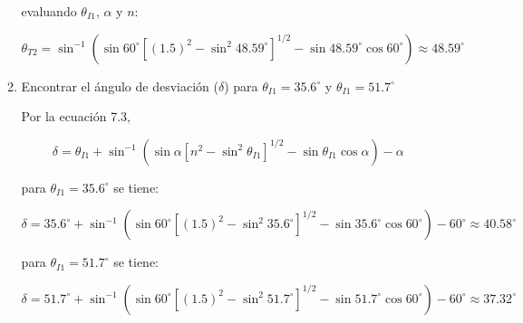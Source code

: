 \documentclass[12pt,a4paper]{article}
\begin{document}
\begin{enumerate}
\begin{enumerate}
    evaluando $\theta_{I1}$, $\alpha$ y $n$: 
    
    \begin{equation*}
        \theta_{T2} = \sin^{-1}{\left(\sin{60^{\circ}}[(1.5)^2-\sin^{2}{48.59^{\circ}}]^{1/2}-\sin{48.59^{\circ}}\cos{60^{\circ}}\right)} \approx 48.59^{\circ}
    \end{equation*}
    
    \item Encontrar el ángulo de desviación ($\delta$) para $\theta_{I1}=35.6^{\circ}$ y $\theta_{I1}=51.7^{\circ}$
    
    Por la ecuación 7.3,
    
    \begin{equation*}
        \delta = \theta_{I1}+ \sin^{-1}{\left(\sin{\alpha}[n^2-\sin^{2}{\theta_{I1}}]^{1/2}-\sin{\theta_{I1}\cos{\alpha}}\right)}-\alpha 
    \end{equation*}
    
    para $\theta_{I1}=35.6^{\circ}$ se tiene:
    
    \begin{equation*}
        \delta = 35.6^{\circ}+ \sin^{-1}{\left(\sin{60^{\circ}}[(1.5)^2-\sin^{2}{35.6^{\circ}}]^{1/2}-\sin{35.6^{\circ}}\cos{60^{\circ}}\right)}-60^{\circ} \approx 40.58^{\circ} 
    \end{equation*}
    
    para $\theta_{I1}=51.7^{\circ}$ se tiene:
    
    \begin{equation*}
        \delta = 51.7^{\circ}+ \sin^{-1}{\left(\sin{60^{\circ}}[(1.5)^2-\sin^{2}{51.7^{\circ}}]^{1/2}-\sin{51.7^{\circ}}\cos{60^{\circ}}\right)}-60^{\circ} \approx 37.32^{\circ} 
    \end{equation*}
    
    
    
\end{enumerate}

    
    
\end{enumerate}
\end{document}
